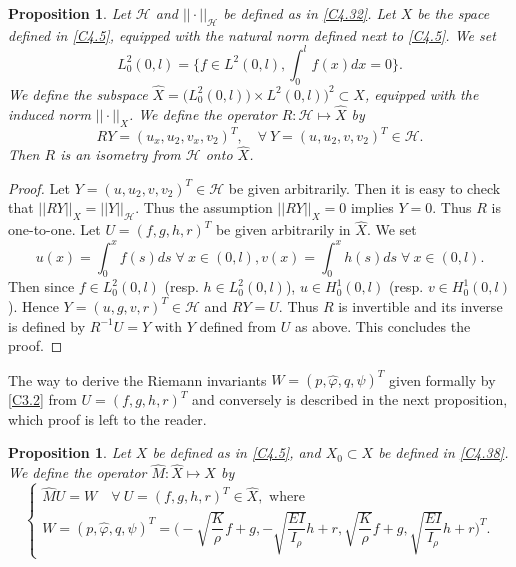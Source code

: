 \documentclass[10pt, english]{article}
\newtheorem{prop}[thm]{Proposition}
\begin{document}
{\begin{prop}\label{R}
Let $\mathcal{H}$ and $||\cdot||_{\mathcal{H}}$ be defined as in \eqref{C4.32}. Let $X$ be the space defined in \eqref{C4.5}, equipped with the natural norm defined next to \eqref{C4.5}. We set
\begin{equation}\label{C4.36}%
L^2_0(0,l)=\Big\{f \in L^2(0,l), \int_0^l f(x)dx=0\Big\}.
\end{equation}
We define the subspace $\widehat{X}=\big(L_0^2(0,l))\times L^2(0,l)\big)^2 \subset X$, equipped with the induced norm $||\cdot||_X$.
We define the operator $R: \mathcal{H} \mapsto \widehat{X}$ by
\begin{equation}\label{C4.51R}%
RY=(u_x,u_2,v_x,v_2)^T, \quad \forall \ Y=(u,u_2,v,v_2)^T \in \mathcal{H}.
\end{equation}
Then $R$ is an isometry from $\mathcal{H}$ onto $\widehat{X}$. 
\end{prop}
\begin{proof}
Let $Y=(u,u_2,v,v_2)^T \in \mathcal{H}$ be given arbitrarily. Then it is easy to check that
$||RY||_X=||Y||_{\mathcal{H}}$. Thus the assumption $||RY||_X=0$ implies $Y=0$. Thus $R$ is one-to-one. Let
$U=(f,g,h,r)^T$ be given arbitrarily in  $\widehat{X}$. We set 
\begin{equation}\label{C4.52}%
u(x)=\int_0^xf(s)ds \;  \forall \ x \in (0,l), v(x)=\int_0^xh(s)ds \; \forall \ x \in (0,l).
\end{equation}
Then since $f\in L^2_0(0,l)$ (resp. $h\in L^2_0(0,l)$), $u \in H^1_0(0,l)$ (resp. $v \in H^1_0(0,l)$). Hence $Y=(u,g,v,r)^T \in \mathcal{H}$ and $RY=U$. Thus $R$ is invertible and its inverse is defined by $R^{-1}U=Y$ with $Y$ defined from $U$ as above. This concludes the proof.
\end{proof}
The way to derive the Riemann invariants $W=(p,\widehat{\varphi}, q, \psi)^T$ given formally by \eqref{C3.2} from $U=(f,g,h,r)^T$ and conversely is described in the next proposition, which proof is left to the reader.
\begin{prop}\label{M}
Let $X$ be defined as in \eqref{C4.5}, and $X_0 \subset X$ be defined in \eqref{C4.38}.
We define the operator $\widehat{M}: \widehat{X} \mapsto X$
by
\begin{equation}\label{C4.53M}%
\begin{cases}
\widehat{M}U=W \quad \forall \ U=(f,g,h,r)^T \in \widehat{X} , \mbox{ where }\\
W=(p,\widehat{\varphi}, q, \psi)^T=\Big(-\sqrt{\dfrac{K}{\rho}}f + g, -\sqrt{\dfrac{EI}{I_{\rho}}}h + r, \sqrt{\dfrac{K}{\rho}}f + g,
\sqrt{\dfrac{EI}{I_{\rho}}}h + r\Big)^T.
\end{cases}
\end{equation}


\end{prop}}
\end{document}
